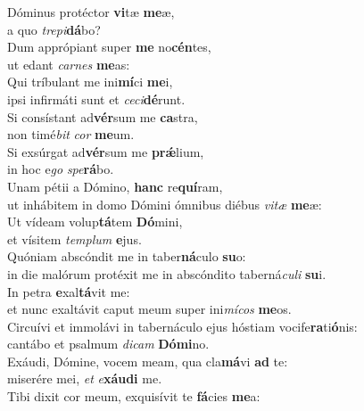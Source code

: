 \evenverse Dóminus protéctor \textbf{vi}tæ \textbf{me}æ,~\*\\
\evenverse a quo \textit{tre}\textit{pi}\textbf{dá}bo?\\
\oddverse Dum apprópiant super \textbf{me} no\textbf{cén}tes,~\*\\
\oddverse ut edant \textit{car}\textit{nes} \textbf{me}as:\\
\evenverse Qui tríbulant me ini\textbf{mí}ci \textbf{me}i,~\*\\
\evenverse ipsi infirmáti sunt et \textit{ce}\textit{ci}\textbf{dé}runt.\\
\oddverse Si consístant ad\textbf{vér}sum me \textbf{ca}stra,~\*\\
\oddverse non timé\textit{bit} \textit{cor} \textbf{me}um.\\
\evenverse Si exsúrgat ad\textbf{vér}sum me \textbf{prǽ}lium,~\*\\
\evenverse in hoc e\textit{go} \textit{spe}\textbf{rá}bo.\\
\oddverse Unam pétii a Dómino, \textbf{hanc} re\textbf{quí}ram,~\*\\
\oddverse ut inhábitem in domo Dómini ómnibus diébus \textit{vi}\textit{tæ} \textbf{me}æ:\\
\evenverse Ut vídeam volup\textbf{tá}tem \textbf{Dó}mini,~\*\\
\evenverse et vísitem \textit{tem}\textit{plum} \textbf{e}jus.\\
\oddverse Quóniam abscóndit me in taber\textbf{ná}culo \textbf{su}o:~\*\\
\oddverse in die malórum protéxit me in abscóndito taberná\textit{cu}\textit{li} \textbf{su}i.\\
\evenverse In petra \textbf{e}xal\textbf{tá}vit me:~\*\\
\evenverse et nunc exaltávit caput meum super ini\textit{mí}\textit{cos} \textbf{me}os.\\
\oddverse Circuívi et immolávi in tabernáculo ejus hóstiam vocife\textbf{ra}ti\textbf{ó}nis:~\*\\
\oddverse cantábo et psalmum \textit{di}\textit{cam} \textbf{Dó}\textbf{mi}no.\\
\evenverse Exáudi, Dómine, vocem meam, qua cla\textbf{má}vi \textbf{ad} te:~\*\\
\evenverse miserére mei, \textit{et} \textit{e}\textbf{xáu}\textbf{di} me.\\
\oddverse Tibi dixit cor meum, exquisívit te \textbf{fá}cies \textbf{me}a:~\*\\
